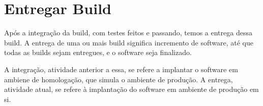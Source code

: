 \section{Entregar Build}
\label{sec:entregar}

Após a integração da build, com testes feitos e passando, temos a entrega dessa build. A entrega de uma ou mais build significa incremento de software, até que todas as builds sejam entregues, e o software seja finalizado.

A integração, atividade anterior a essa, se refere a implantar o software em ambiene de homologação, que simula o ambiente de produção. A entrega, atividade atual, se refere à implantação do software em ambiente de produção em si.
